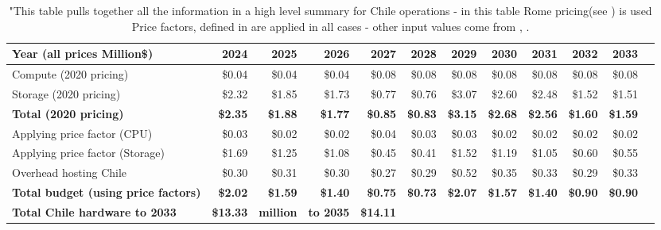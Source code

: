 \tiny \begin{longtable} { |p{}  |r  |r  |r  |r  |r  |r  |r  |r  |r  |r  |r |} 
\caption{"This table pulls together all the information in a high level summary 
for Chile operations - in this table Rome pricing(see 
) is used  Price factors, defined in 
 are applied in all cases - other input values come 
from , . \label{tab:opsChileR}}\\ 
\hline 
\textbf{Year  (all prices Million\$)}&\textbf{2024}&\textbf{2025}&\textbf{2026}&\textbf{2027}&\textbf{2028}&\textbf{2029}&\textbf{2030}&\textbf{2031}&\textbf{2032}&\textbf{2033} \\ \hline
{Compute (2020 pricing)}&{\$0.04}&{\$0.04}&{\$0.04}&{\$0.08}&{\$0.08}&{\$0.08}&{\$0.08}&{\$0.08}&{\$0.08}&{\$0.08} \\ \hline
{Storage (2020 pricing)}&{\$2.32}&{\$1.85}&{\$1.73}&{\$0.77}&{\$0.76}&{\$3.07}&{\$2.60}&{\$2.48}&{\$1.52}&{\$1.51} \\ \hline
\textbf{Total (2020 pricing)}&\textbf{\$2.35}&\textbf{\$1.88}&\textbf{\$1.77}&\textbf{\$0.85}&\textbf{\$0.83}&\textbf{\$3.15}&\textbf{\$2.68}&\textbf{\$2.56}&\textbf{\$1.60}&\textbf{\$1.59} \\ \hline
{Applying price factor (CPU)}&{\$0.03}&{\$0.02}&{\$0.02}&{\$0.04}&{\$0.03}&{\$0.03}&{\$0.02}&{\$0.02}&{\$0.02}&{\$0.02} \\ \hline
{Applying price factor (Storage)}&{\$1.69}&{\$1.25}&{\$1.08}&{\$0.45}&{\$0.41}&{\$1.52}&{\$1.19}&{\$1.05}&{\$0.60}&{\$0.55} \\ \hline
{Overhead hosting Chile}&{\$0.30}&{\$0.31}&{\$0.30}&{\$0.27}&{\$0.29}&{\$0.52}&{\$0.35}&{\$0.33}&{\$0.29}&{\$0.33} \\ \hline
\textbf{Total budget (using price factors)}&\textbf{\$2.02}&\textbf{\$1.59}&\textbf{\$1.40}&\textbf{\$0.75}&\textbf{\$0.73}&\textbf{\$2.07}&\textbf{\$1.57}&\textbf{\$1.40}&\textbf{\$0.90}&\textbf{\$0.90} \\ \hline
\textbf{Total Chile hardware to 2033}&\textbf{\$13.33}&\textbf{million}&\textbf{to 2035}&\textbf{\$14.11}&&&&&& \\ \hline
\end{longtable} \normalsize
